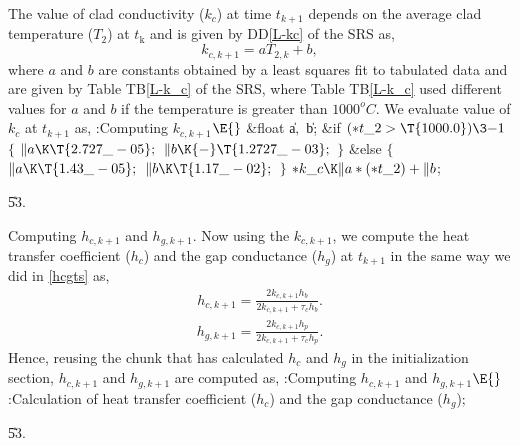 \documentclass[letterpaper,12pt,baseclass=report]{cweb-hy}
\begin{document}
{
The value of clad conductivity ($k_c$) at time $t_{k+1}$ depends on the average
clad
temperature ($T_2$) at $t_{\text{k}}$ and is given by DD\ref{L-kc} of the SRS
as,
\begin{equation}
k_{c,k+1} = aT_{2,k} + b \label{eq:kck},
\end{equation}
where $a$ and $b$ are constants obtained by a least squares fit to tabulated
data and are
given by Table TB\ref{L-k_c} of the SRS, where Table TB\ref{L-k_c} used
different values
for $a$ and $b$ if the temperature is greater than $1000^oC$.
We evaluate value of $k_c$ at $t_{k+1}$ as,
\Y\B\4:Computing $k_{c,k+1}$\X${}\E{}$\6
\&{float} \|a${},{}$ \|b;\7
\&{if} ${}({*}\\{t\_2}>\T{1000.0})\3{-1}{}$\5
${}\{{}$\1\6
${}\|a\K\T{2.727\_-05};{}$\6
${}\|b\K{-}\T{1.2727\_-03};{}$\6
\4${}\}{}$\2\6
\&{else}\5
${}\{{}$\1\6
${}\|a\K\T{1.43\_-05};{}$\6
${}\|b\K\T{1.17\_-02};{}$\6
\4${}\}{}$\2\6
${}{*}\\{k\_c}\K\|a*({*}\\{t\_2})+\|b{}$;\par
\U53.\fi

\fi

Computing ${h_{c,k+1}}$ and ${h_{g,k+1}}$.
Now using the $k_{c,k+1}$, we compute the heat transfer
coefficient ($h_c$) and the gap conductance ($h_g$) at $t_{k+1}$ in
the same way we did in \ref{hcgts} as,
\begin{align}
h_{c,k+1} =\frac{ 2k_{c,k+1}h_{b}}{2k_{c,k+1}+\tau_ch_{b}}. \label{eq:hck}
\end{align}
\begin{align}
h_{g,k+1} =\frac{2k_{c,k+1}h_{p}}{2k_{c,k+1}+\tau_c h_{p}}. \label{eq:hgk}
\end{align}
Hence, reusing the chunk that has calculated $h_c$ and $h_g$ in the
initialization
section, $h_{c,k+1}$ and $h_{g,k+1}$ are computed as,
\Y\B\4:Computing $h_{c,k+1}$ and $h_{g,k+1}$\X${}\E{}$\6
:Calculation of heat transfer coefficient ($h_{c}$) and the gap conductance
($h_{g}$)\X;\par
\U53.\fi

\fi

}
\end{document}
